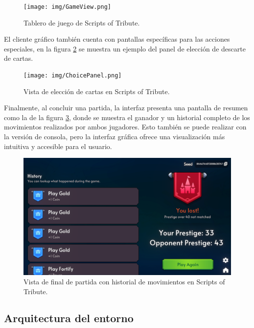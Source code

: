 \begin{figure}[H]
	\centering
	\texttt{[image: img/GameView.png]}
	\caption{Tablero de juego de Scripts of Tribute. \cite{ematerasu_scriptsoftribute-gui-20_2025}}
	\label{fig:game_view}
\end{figure}

El cliente gráfico también cuenta con pantallas específicas para las acciones especiales, en la figura \ref{fig:choice_panel} se muestra un ejemplo del panel de elección de descarte de cartas.

\begin{figure}[H]
	\centering
	\texttt{[image: img/ChoicePanel.png]}
	\caption{Vista de elección de cartas en Scripts of Tribute. \cite{ematerasu_scriptsoftribute-gui-20_2025}}
	\label{fig:choice_panel}
\end{figure}

Finalmente, al concluir una partida, la interfaz presenta una pantalla de resumen como la de la figura \ref{fig:game_end}, donde se muestra el ganador y un historial completo de los movimientos realizados por ambos jugadores. Esto también se puede realizar con la versión de consola, pero la interfaz gráfica ofrece una visualización más intuitiva y accesible para el usuario.

\begin{figure}[H]
	\centering
	\includegraphics[width=1.0\textwidth]{img/GameEnd.png}
	\caption{Vista de final de partida con historial de movimientos en Scripts of Tribute. \cite{ematerasu_scriptsoftribute-gui-20_2025}}
	\label{fig:game_end}
\end{figure}

\subsection{Arquitectura del entorno} \label{sec:arquitectura_entorno}

